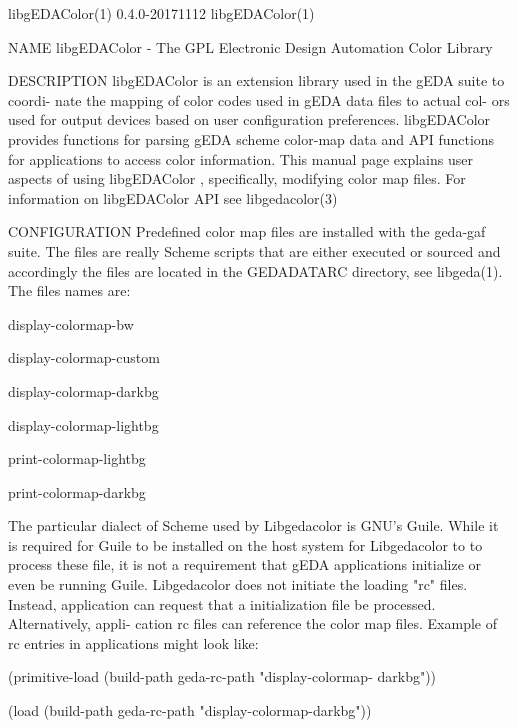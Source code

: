 libgEDAColor(1)                 0.4.0-20171112                 libgEDAColor(1)



NAME
       libgEDAColor - The GPL Electronic Design Automation Color Library

DESCRIPTION
       libgEDAColor  is an extension library used in the gEDA suite to coordi-
       nate the mapping of color codes used in gEDA data files to actual  col-
       ors  used  for  output devices based on user configuration preferences.
       libgEDAColor provides functions for parsing gEDA scheme color-map  data
       and  API  functions  for applications to access color information. This
       manual page explains user aspects of using libgEDAColor , specifically,
       modifying  color  map  files.  For  information on libgEDAColor API see
       libgedacolor(3)

CONFIGURATION
       Predefined color map files are installed with the geda-gaf  suite.  The
       files are really Scheme scripts that are either executed or sourced and
       accordingly the files are located  in  the  GEDADATARC  directory,  see
       libgeda(1).  The files names are:

              display-colormap-bw

              display-colormap-custom

              display-colormap-darkbg

              display-colormap-lightbg

              print-colormap-lightbg

              print-colormap-darkbg

       The  particular  dialect of Scheme used by Libgedacolor is GNU's Guile.
       While it is required for Guile to be installed on the host  system  for
       Libgedacolor  to  to  process  these file, it is not a requirement that
       gEDA applications initialize or even be  running  Guile.   Libgedacolor
       does  not  initiate  the  loading  "rc" files. Instead, application can
       request that a initialization file be processed. Alternatively,  appli-
       cation  rc  files  can  reference  the  color  map files. Example of rc
       entries in applications might look like:

              (primitive-load  (build-path   geda-rc-path   "display-colormap-
              darkbg"))

              (load (build-path geda-rc-path "display-colormap-darkbg"))

